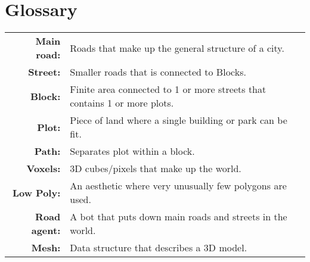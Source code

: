 \section*{Glossary}

\begin{table}[h!]
    \centering
    \begin{tabular}{rl}
        \textbf{Main road:}  & Roads that make up the general structure of a city.                       \\
        \textbf{Street:}     & Smaller roads that is connected to Blocks.                                \\
        \textbf{Block:}      & Finite area connected to 1 or more streets that contains 1 or more plots. \\
        \textbf{Plot:}       & Piece of land where a single building or park can be fit.                 \\
        \textbf{Path:}       & Separates plot within a block.                                            \\
        \textbf{Voxels:}     & 3D cubes/pixels that make up the world.                                   \\
        \textbf{Low Poly:}   & An aesthetic where very unusually few polygons are used.                  \\
        \textbf{Road agent:} & A bot that puts down main roads and streets in the world.                 \\
        \textbf{Mesh:}       & Data structure that describes a 3D model.                                
    \end{tabular}
\end{table}